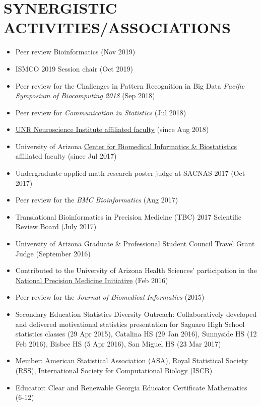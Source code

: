 \documentclass[paper=a4,fontsize=11pt]{scrartcl} %
\newcommand{\NewPart}[2]{\section*{\uppercase{#1} #2 }}
\begin{document}

\NewPart{Synergistic Activities/Associations}{}
\vspace{-7pt}
\begin{itemize}[noitemsep]
    \item Peer review Bioinformatics (Nov 2019)
  \item ISMCO 2019 Session chair (Oct 2019)
  \item Peer review for the Challenges in Pattern Recognition in Big Data \emph{Pacific Symposium of Biocomputing 2018} (Sep 2018)
  \item Peer review for \emph{Communication in Statistics} (Jul 2018)
\item \href{https://www.unr.edu/neuroscience/people}{UNR Neuroscience Institute affiliated faculty} (since Aug 2018)
  \item University of Arizona \href{http://cb2.uahs.arizona.edu/}{Center for Biomedical Informatics \& Biostatistics} affiliated faculty (since Jul 2017)
\item Undergraduate applied math research poster judge at SACNAS 2017 (Oct 2017)
\item Peer review for the \emph{BMC Bioinformatics} (Aug 2017)
\item Translational Bioinformatics in Precision Medicine (TBC) 2017 Scientific Review Board (July 2017)
\item University of Arizona Graduate \& Professional Student Council Travel Grant Judge (September 2016)
\item Contributed to the University of Arizona Health Sciences' participation in the   \href{https://www.nih.gov/precision-medicine-initiative-cohort-program}{National Precision Medicine Initiative\circledR}  \hspace{3pt}(Feb 2016)
  \item Peer review for the \emph{Journal of Biomedical Informatics} (2015)
\item Secondary Education Statistics Diversity Outreach: Collaboratively developed and delivered motivational statistics presentation for Saguaro High School statistics classes (29 Apr 2015), Catalina HS (29 Jan 2016), Sunnyside HS (12 Feb 2016), Bisbee HS (5 Apr 2016), San Miguel HS (23 Mar 2017)
\item Member: American Statistical Association (ASA), Royal Statistical Society (RSS), International Society for Computational Biology (ISCB)
\item Educator: Clear and Renewable Georgia Educator Certificate Mathematics (6-12)
\vspace{-7pt}
\end{itemize}
\end{document}
